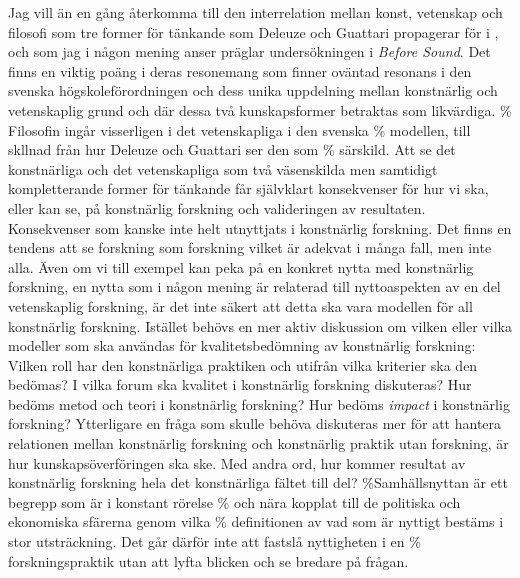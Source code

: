 \documentclass[11pt]{article}
\begin{document}
Jag vill än en gång återkomma till den interrelation mellan konst,
vetenskap och filosofi som tre former för tänkande som Deleuze och
Guattari propagerar för i , och som jag i någon
mening anser präglar undersökningen i \emph{Before Sound}. Det finns
en viktig poäng i deras resonemang som finner oväntad resonans i den
svenska högskoleförordningen och dess unika uppdelning mellan
konstnärlig och vetenskaplig grund och där dessa två kunskapsformer
betraktas som likvärdiga.
\% Filosofin ingår visserligen i det vetenskapliga i den svenska
\% modellen, till skllnad från hur Deleuze och Guattari ser den som
\% särskild.
Att se det konstnärliga och det vetenskapliga som två väsenskilda men
samtidigt kompletterande former för tänkande får självklart
konsekvenser för hur vi ska, eller kan se, på konstnärlig forskning
och valideringen av resultaten. Konsekvenser som kanske inte helt
utnyttjats i konstnärlig forskning. Det finns en tendens att se
forskning som forskning vilket är adekvat i många fall, men inte
alla. Även om vi till exempel kan peka på en konkret nytta med
konstnärlig forskning, en nytta som i någon mening är relaterad till
nyttoaspekten av en del vetenskaplig forskning, är det inte säkert att
detta ska vara modellen för all konstnärlig forskning. Istället behövs
en mer aktiv diskussion om vilken eller vilka modeller som ska
användas för kvalitetsbedömning av konstnärlig forskning: Vilken roll
har den konstnärliga praktiken och utifrån vilka kriterier ska den
bedömas? I vilka forum ska kvalitet i konstnärlig forskning
diskuteras? Hur bedöms metod och teori i konstnärlig forskning? Hur
bedöms \emph{impact} i konstnärlig
forskning?  Ytterligare en fråga som skulle behöva diskuteras mer för att hantera
relationen mellan konstnärlig forskning och konstnärlig praktik utan
forskning, är hur kunskapsöverföringen ska ske. Med andra ord, hur
kommer resultat av konstnärlig forskning hela det konstnärliga fältet
till del?
\%Samhällsnyttan är ett begrepp som är i konstant rörelse
\% och nära kopplat till de politiska och ekonomiska sfärerna genom vilka
\% definitionen av vad som är nyttigt bestäms i stor utsträckning. Det går därför inte att fastslå nyttigheten i en
\% forskningspraktik utan att lyfta blicken och se bredare på frågan.
\end{document}
